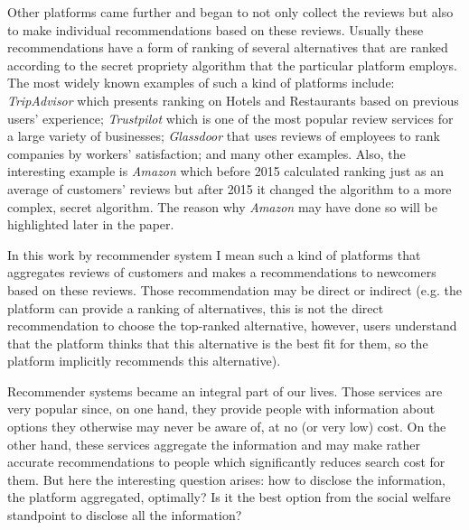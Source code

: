 \documentclass[a4paper]{article}
\begin{document}
	
	
	 Other platforms came further and began to not only collect the reviews but also to make individual recommendations based on these reviews. Usually these recommendations have a form of ranking of several alternatives that are ranked according to the secret propriety algorithm that the particular platform employs. The most widely known examples of such a kind of platforms include: \textit{TripAdvisor} which presents ranking on Hotels and Restaurants based on previous users' experience; \textit{Trustpilot} which is one of the most popular review services for a large variety of businesses; \textit{Glassdoor} that uses reviews of employees to rank companies by workers' satisfaction; and many other examples. Also, the interesting example is \textit{Amazon} which before 2015 calculated ranking just as an average of customers' reviews but after 2015 it changed the algorithm to a more complex, secret algorithm. The reason why \textit{Amazon} may have done so will be highlighted later in the paper. 
	 
	 
	 
	 
	 In this work by recommender system I mean such a kind of platforms that aggregates reviews of customers and makes a recommendations to newcomers based on these reviews. Those recommendation may be direct or indirect (e.g. the platform can provide a ranking of alternatives, this is not the direct recommendation to choose the top-ranked alternative, however, users understand that the platform thinks that this alternative is the best fit for them, so the platform implicitly recommends this alternative).
	 
	 
	 
	 
	 
	Recommender systems became an integral part of our lives. Those services are very popular since, on one hand, they provide people with information about options they otherwise may never be aware of, at no (or very low) cost. On the other hand, these services aggregate the information and may make rather accurate recommendations to people which significantly reduces search cost for them. But here the interesting question arises: how to disclose the information, the platform aggregated, optimally? Is it the best option from the social welfare standpoint to disclose all the information? 
		
\end{document}
